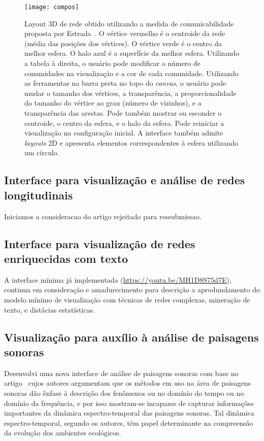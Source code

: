 \documentclass[a4paper, 11pt]{article}
\begin{document}
\begin{figure}[h!]
\centering
  \texttt{[image: compos]}
\caption{%
  Layout 3D de rede obtido utilizando a medida de comunicabilidade proposta por Estrada~\cite{ern2,ern3}.
  O vértice vermelho é o centroide da rede (média das posições
  dos vértices).
  O vértice verde é o centro da melhor esfera.
  O halo azul é a superfície da melhor esfera.
  Utilizando a tabela à direita, o usuário pode
  modificar o número de comunidades na visualização
  e a cor de cada comunidade.
  Utilizando as ferramentas na barra preta no topo do \emph{canvas},
  o usuário pode mudar o tamanho dos vértices, a transparência,
  a proporcionalidade do tamanho do vértice ao grau (número de vizinhos),
  e a transparência das arestas.
  Pode também mostrar ou esconder o centroide, o centro da esfera,
  e o halo da esfera.
  Pode reiniciar a visualização na configuração inicial. %
  A interface também admite \emph{layouts} 2D e
  apresenta elementos correspondentes à esfera utilizando um círculo.
}\label{com}
\end{figure}


\subsection{Interface para visualização e análise de redes longitudinais}\label{sevo}
Iniciamos a consideracao do artigo rejeitado para ressubmissao.

\subsection{Interface para visualização de redes enriquecidas com texto}
A interface mínima já implementada (\url{https://youtu.be/MH1D8S75d7E}),
continua em consideração e amadurecimento para descrição a aprodundamento
do modelo mínimo de visualização com técnicas de redes complexas, mineração
de texto, e distâcias estatísticas.

\subsection{Visualização para auxílio à análise de paisagens sonoras}\label{pa}
Desenvolvi uma nova interface de análise de paisagens sonoras com base no artigo~\cite{eld} cujos autores argumentam que os métodos em uso na área de paisagens sonoras dão ênfase à descrição dos fenômenos ou no domínio do tempo ou no domínio da frequência, e por isso mostram-se incapazes de capturar informações importantes da dinâmica espectro-temporal das paisagens sonoras. Tal dinâmica espectro-temporal, segundo os autores, têm papel determinante na compreensão da evolução dos ambientes ecológicos.
\end{document}
